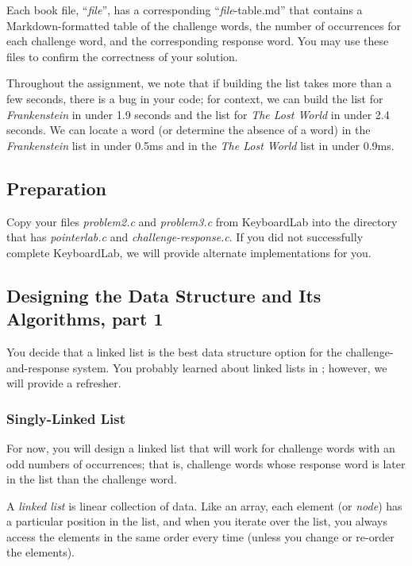 Each book file, ``\textit{file}'', has a corresponding ``\textit{file}-table.md'' that contains a Markdown-formatted table of the challenge words, the number of occurrences for each challenge word, and the corresponding response word.
You may use these files to confirm the correctness of your solution.

Throughout the assignment, we note that if building the list takes more than a few seconds, there is a bug in your code;
for context, we can build the list for \textit{Frankenstein} in under 1.9 seconds and the list for \textit{The Lost World} in under 2.4 seconds.
We can locate a word (or determine the absence of a word) in the \textit{Frankenstein} list in under 0.5ms and in the \textit{The Lost World} list in under 0.9ms.

\subsection{Preparation}

Copy your files \textit{problem2.c} and \textit{problem3.c} from KeyboardLab into the directory that has \textit{pointerlab.c} and \textit{challenge-response.c}.
If you did not successfully complete KeyboardLab, we will provide alternate implementations for you.

\subsection{Designing the Data Structure and Its Algorithms, part 1}

You decide that a linked list is the best data structure option for the challenge-and-response system.
You probably learned about linked lists in \cstwo; however, we will provide a refresher.

\subsubsection{Singly-Linked List} \label{subsubsec:singlylinkedlist}

For now, you will design a linked list that will work for challenge words with an odd numbers of occurrences;
that is, challenge words whose response word is later in the list than the challenge word.

A \textit{linked list} is linear collection of data.
Like an array, each element (or \textit{node}) has a particular position in the list, and when you iterate over the list, you always access the elements in the same order every time (unless you change or re-order the elements).


